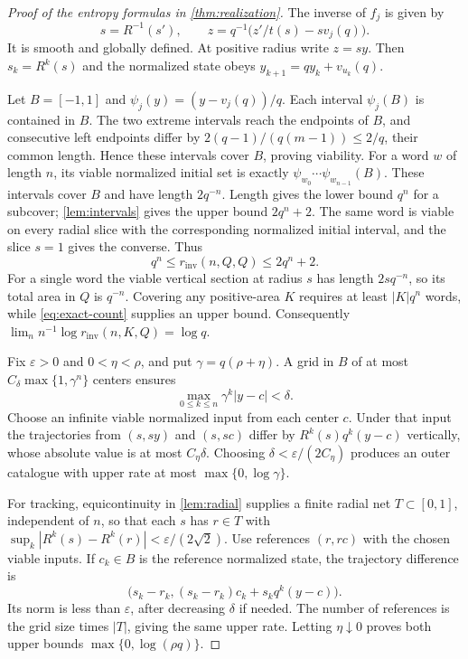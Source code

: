 \documentclass[11pt,a4paper]{article}
\theoremstyle{remark}
\newcommand{\rinv}{r_{\mathrm{inv}}}
\begin{document}
\begin{proof}[Proof of the entropy formulas in \cref{thm:realization}]
The inverse of $f_j$ is given by
\[
 s=R^{-1}(s'),\qquad z=q^{-1}\bigl(z'/t(s)-sv_j(q)\bigr).
\]
It is smooth and globally defined. At positive radius write $z=sy$.
Then $s_k=R^k(s)$ and the normalized state obeys
$y_{k+1}=qy_k+v_{u_k}(q)$.

Let $B=[-1,1]$ and $\psi_j(y)=(y-v_j(q))/q$.
Each interval $\psi_j(B)$ is contained in $B$. The two extreme intervals
reach the endpoints of $B$, and consecutive left endpoints differ by
$2(q-1)/(q(m-1))\leq2/q$, their common length. Hence these intervals
cover $B$, proving viability.
For a word $w$ of length $n$, its viable normalized initial set is exactly
$\psi_{w_0}\cdots\psi_{w_{n-1}}(B)$. These intervals cover $B$ and have
length $2q^{-n}$. Length gives the lower bound $q^n$ for a subcover;
\cref{lem:intervals} gives the upper bound $2q^n+2$.
The same word is viable on every radial slice with the corresponding
normalized initial interval, and the slice $s=1$ gives the converse.
Thus
\begin{equation}\label{eq:exact-count}
 q^n\leq\rinv(n,Q,Q)\leq2q^n+2.
\end{equation}
For a single word the viable vertical section at radius $s$ has length
$2sq^{-n}$, so its total area in $Q$ is $q^{-n}$.
Covering any positive-area $K$ requires at least $|K|q^n$ words, while
\eqref{eq:exact-count} supplies an upper bound. Consequently
$\lim_n n^{-1}\log\rinv(n,K,Q)=\log q$.

Fix $\varepsilon>0$ and $0<\eta<\rho$, and put
$\gamma=q(\rho+\eta)$. A grid in $B$ of at most
$C_\delta\max\{1,\gamma^n\}$ centers ensures
\[
 \max_{0\leq k\leq n}\gamma^k|y-c|<\delta.
\]
Choose an infinite viable normalized input from each center $c$.
Under that input the trajectories from $(s,sy)$ and $(s,sc)$ differ by
$R^k(s)q^k(y-c)$ vertically, whose absolute value is at most
$C_\eta\delta$. Choosing $\delta<\varepsilon/(2C_\eta)$ produces an
outer catalogue with upper rate at most $\max\{0,\log\gamma\}$.

For tracking, equicontinuity in \cref{lem:radial} supplies a finite radial
net $T\subset[0,1]$, independent of $n$, so that each $s$ has $r\in T$
with $\sup_k|R^k(s)-R^k(r)|<\varepsilon/(2\sqrt2)$.
Use references $(r,rc)$ with the chosen viable inputs. If $c_k\in B$
is the reference normalized state, the trajectory difference is
\[
 \bigl(s_k-r_k,(s_k-r_k)c_k+s_kq^k(y-c)\bigr).
\]
Its norm is less than $\varepsilon$, after decreasing $\delta$ if needed.
The number of references is the grid size times $|T|$, giving the same
upper rate. Letting $\eta\downarrow0$ proves both upper bounds
$\max\{0,\log(\rho q)\}$.


\end{proof}
\end{document}
